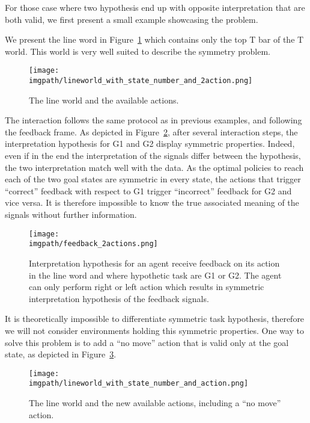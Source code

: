 For those case where two hypothesis end up with opposite interpretation that are both valid, we first present a small example showcasing the problem.

We present the line word in Figure~\ref{fig:lineworld} which contains only the top T bar of the T world. This world is very well suited to describe the symmetry problem. 

\begin{figure}[!ht]
  \centering
  \texttt{[image: \\imgpath/lineworld\_with\_state\_number\_and\_2action.png]}
  \caption{The line world and the available actions.}
  \label{fig:lineworld}
\end{figure}

The interaction follows the same protocol as in previous examples, and following the feedback frame. As depicted in Figure~\ref{fig:lineworldfeedback2action}, after several interaction steps, the interpretation hypothesis for G1 and G2 display symmetric properties. Indeed, even if in the end the interpretation of the signals differ between the hypothesis, the two interpretation match well with the data. As the optimal policies to reach each of the two goal states are symmetric in every state, the actions that trigger ``correct'' feedback with respect to G1 trigger ``incorrect'' feedback for G2 and vice versa. It is therefore impossible to know the true associated meaning of the signals without further information.

\begin{figure}[!ht]
  \centering
  \texttt{[image: \\imgpath/feedback\_2actions.png]}
  \caption{Interpretation hypothesis for an agent receive feedback on its action in the line word and where hypothetic task are G1 or G2. The agent can only perform right or left action which results in symmetric interpretation hypothesis of the feedback signals.}
  \label{fig:lineworldfeedback2action}
\end{figure}

It is theoretically impossible to differentiate symmetric task hypothesis, therefore we will not consider environments holding this symmetric properties. One way to solve this problem is to add a ``no move'' action that is valid only at the goal state, as depicted in Figure~\ref{fig:lineworld3action}.

\begin{figure}[!ht]
  \centering
  \texttt{[image: \\imgpath/lineworld\_with\_state\_number\_and\_action.png]}
  \caption{The line world and the new available actions, including a ``no move'' action.}
  \label{fig:lineworld3action}
\end{figure}

